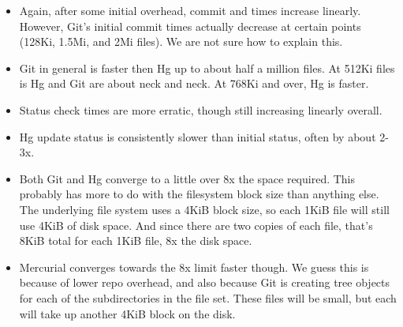 \documentclass[a4paper]{article}
\begin{document}
\begin{itemize}

    \item Again, after some initial overhead, commit and times increase
        linearly. However, Git's initial commit times actually decrease at
        certain points (128Ki, 1.5Mi, and 2Mi files). We are not sure how to
        explain this.

    \item Git in general is faster then Hg up to about half a million files. At
        512Ki files is Hg and Git are about neck and neck. At 768Ki and over, Hg
        is faster.

    \item Status check times are more erratic, though still increasing linearly
        overall.

    \item Hg update status is consistently slower than initial status, often by
        about 2-3x.

    \item Both Git and Hg converge to a little over 8x the space required. This
        probably has more to do with the filesystem block size than anything
        else. The underlying file system uses a 4KiB block size, so each 1KiB
        file will still use 4KiB of disk space. And since there are two copies
        of each file, that's 8KiB total for each 1KiB file, 8x the disk space.

    \item Mercurial converges towards the 8x limit faster though. We guess this
        is because of lower repo overhead, and also because Git is creating tree
        objects for each of the subdirectories in the file set. These files will
        be small, but each will take up another 4KiB block on the disk.

\end{itemize}
\end{document}

